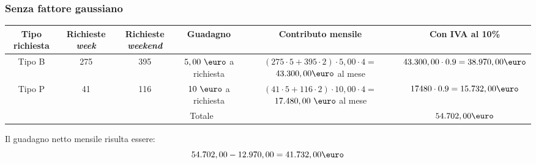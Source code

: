 \documentclass[a4paper, 12pt]{article}
\begin{document}
\subsubsection{Senza fattore gaussiano}
\begin{adjustbox}{width=\textwidth}
\begin{tabular}{|c|c|c|c|c|c|}
\hline
\cellcolor{cellcolor}Tipo richiesta & \cellcolor{cellcolor}Richieste \textit{week} & \cellcolor{cellcolor}Richieste \textit{weekend} & \cellcolor{cellcolor}Guadagno & \cellcolor{cellcolor}Contributo mensile &
\cellcolor{cellcolor} Con IVA al 10\% \\
\hline
\hline
Tipo B & 275 & 395 & $5,00\ \mbox{\euro}$ a richiesta & \makecell{$ (275 \cdot 5 + 395 \cdot 2 )\cdot 5,00 \cdot 4 =$ \\ $43.300,00 \mbox{\euro}$ al mese } & $ 43.300,00 \cdot 0.9 = 38.970,00 \mbox{\euro}$ \\
\hline
Tipo P & 41 & 116 & $10\ \mbox{\euro}$ a richiesta & \makecell{$ (41 \cdot 5 + 116 \cdot 2 )\cdot 10,00 \cdot 4 =$ \\ $17.480,00\ \mbox{\euro}$ al mese } & $ 17480 \cdot 0.9 = 15.732,00 \mbox{\euro}$ \\

\hline
\hline

\multicolumn{5}{|c|}{Totale} & \cellcolor{green!40} $54.702,00 \mbox{\euro}$\\
\hline

\end{tabular}
\end{adjustbox}
\bigskip


Il guadagno netto mensile risulta essere:
\[
	54.702,00 - 12.970,00 = 41.732,00 \mbox{\euro}
\]
\end{document}
